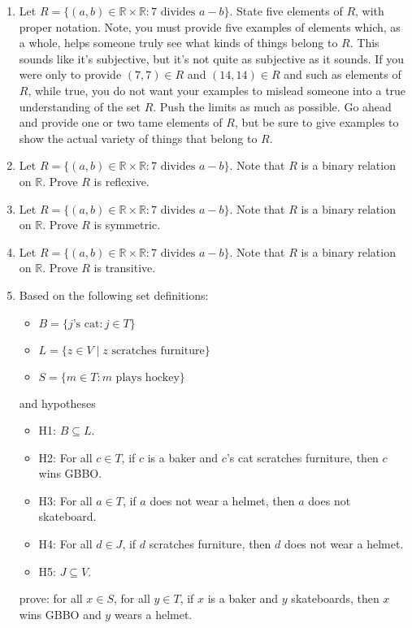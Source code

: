 \documentclass{article}
\begin{document}
\begin{enumerate}

\item Let $R = \{(a,b) \in \mathbb{R} \times \mathbb{R} : 7 \text{ divides } a-b\}$. State five elements of $R$, with proper notation. Note, you must provide five examples of elements which, as a whole, helps someone truly see what kinds of things belong to $R$. This sounds like it's subjective, but it's not quite as subjective as it sounds. If you were only to provide $(7,7) \in R$ and $(14,14) \in R$ and such as elements of $R$, while true, you do not want your examples to mislead someone into a true understanding of the set $R$. Push the limits as much as possible. Go ahead and provide one or two tame elements of $R$, but be sure to give examples to show the actual variety of things that belong to $R$.

\item Let $R = \{(a,b) \in \mathbb{R} \times \mathbb{R} : 7 \text{ divides } a-b\}$. Note that $R$ is a binary relation on $\mathbb{R}$. Prove $R$ is reflexive.

\item Let $R = \{(a,b) \in \mathbb{R} \times \mathbb{R} : 7 \text{ divides } a-b\}$. Note that $R$ is a binary relation on $\mathbb{R}$. Prove $R$ is symmetric.

\item Let $R = \{(a,b) \in \mathbb{R} \times \mathbb{R} : 7 \text{ divides } a-b\}$. Note that $R$ is a binary relation on $\mathbb{R}$. Prove $R$ is transitive.

\item Based on the following set definitions:
\begin{itemize}
\item $B = \{ j\text{'s cat} : j \in T \}$
\item $L = \{ z \in V \mid z \text{ scratches furniture} \}$
\item $S = \{ m \in T : m \text{ plays hockey} \}$
\end{itemize}
and hypotheses
\begin{itemize}
\item H1: $B \subseteq L$.
\item H2: For all $c \in T$, if $c$ is a baker and $c$'s cat scratches furniture, then $c$ wins GBBO.
\item H3: For all $a \in T$, if $a$ does not wear a helmet, then $a$ does not skateboard.
\item H4: For all $d \in J$, if $d$ scratches furniture, then $d$ does not wear a helmet.
\item H5: $J \subseteq V$.
\end{itemize}
prove: for all $x \in S$, for all $y \in T$, if $x$ is a baker and $y$ skateboards, then $x$ wins GBBO and $y$ wears a helmet.

\end{enumerate}
\end{document}
